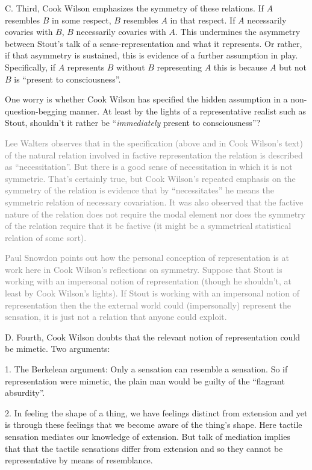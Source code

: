 \documentclass[11pt]{article}
\newcommand{\discuss}[2][gray]{\textcolor{#1}{#2}}
\begin{document}
C. Third, Cook Wilson emphasizes the symmetry of these relations. If \( A \) resembles \( B \) in some respect, \( B \) resembles \( A \) in that respect. If \( A \) necessarily covaries with \( B \), \( B \) necessarily covaries with \( A \). This undermines the asymmetry between Stout's talk of a sense-representation and what it represents. Or rather, if that asymmetry is sustained, this is evidence of a further assumption in play. Specifically, if \( A \) represents \( B \) without \( B \) representing \( A \) this is because \( A \) but not \( B \) is ``present to consciousness''.

One worry is whether Cook Wilson has specified the hidden assumption in a non-question-begging manner. At least by the lights of a representative realist such as Stout, shouldn't it rather be ``\emph{immediately} present to consciousness''? 

\discuss{Lee Walters observes that in the specification (above and in Cook Wilson's text) of the natural relation involved in factive representation the relation is described as ``necessitation''. But there is a good sense of necessitation in which it is not symmetric. That's certainly true, but Cook Wilson's repeated emphasis on the symmetry of the relation is evidence that by ``necessitates'' he means the symmetric relation of necessary covariation. It was also observed that the factive nature of the relation does not require the modal element nor does the symmetry of the relation require that it be factive (it might be a symmetrical statistical relation of some sort).}

\discuss{Paul Snowdon points out how the personal conception of representation is at work here in Cook Wilson's reflections on symmetry. Suppose that Stout is working with an impersonal notion of representation (though he shouldn't, at least by Cook Wilson's lights). If Stout is working with an impersonal notion of representation then the the external world could (impersonally) represent the sensation, it is just not a relation that anyone could exploit.}

D. Fourth, Cook Wilson doubts that the relevant notion of representation could be mimetic. Two arguments:

1. The Berkelean argument: Only a sensation can resemble a sensation. So if representation were mimetic, the plain man would be guilty of the ``flagrant absurdity''.

2. In feeling the shape of a thing, we have feelings distinct from extension and yet is through these feelings that we become aware of the thing's shape. Here tactile sensation mediates our knowledge of extension. But talk of mediation implies that that the tactile sensations differ from extension and so they cannot be representative by means of resemblance.
\end{document}
